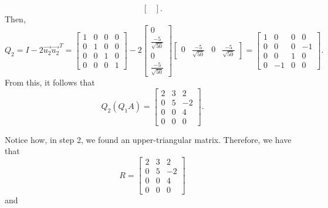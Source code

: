\documentclass[letterpaper]{article}
\newcommand{\0}{\mathbf{0}}
\begin{document}
\begin{itemize}
\[\begin{bmatrix}
    \end{bmatrix}.\]
    Then, 
    \[Q_2 = I - 2\vec{u_2}\vec{u_2}^T = \begin{bmatrix}
        1 & 0 & 0 & 0 \\ 
        0 & 1 & 0 & 0 \\ 
        0 & 0 & 1 & 0 \\ 
        0 & 0 & 0 & 1
    \end{bmatrix} - 2 \begin{bmatrix}
        0 \\ \frac{-5}{\sqrt{50}} \\ 0 \\ \frac{-5}{\sqrt{50}}
    \end{bmatrix} \begin{bmatrix}
        0 & \frac{-5}{\sqrt{50}} & 0 & \frac{-5}{\sqrt{50}}
    \end{bmatrix} = \begin{bmatrix}
        1 & 0 & 0 &0\\ 
        0 & 0 & 0 &-1\\ 
        0 & 0 & 1 &0\\ 
        0 & -1 & 0 & 0
    \end{bmatrix}.\]
    From this, it follows that 
    \[Q_2 (Q_1 A) = \begin{bmatrix}
        2 & 3 & 2 \\ 
        0 & 5 & -2 \\ 
        0 & 0 & 4 \\ 
        0 & 0 & 0
    \end{bmatrix}.\]
\end{itemize}
Notice how, in step 2, we found an upper-triangular matrix. Therefore, we have that 
\[R = \begin{bmatrix}
    2 & 3 & 2 \\ 
    0 & 5 & -2 \\ 
    0 & 0 & 4 \\ 
    0 & 0 & 0
\end{bmatrix}\] and 
\end{document}

